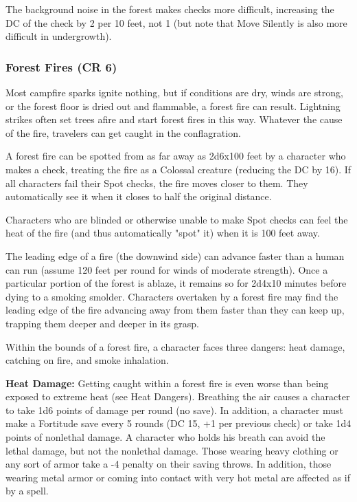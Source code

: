 The background noise in the forest makes  checks more difficult, increasing 
the DC of the check by 2 per 10 feet, not 1 (but note that Move Silently is also 
more difficult in undergrowth). 

\subsubsection{Forest Fires (CR 6)}

Most campfire sparks ignite nothing, but if conditions are dry, winds are strong, 
or the forest floor is dried out and flammable, a forest fire can result. Lightning 
strikes often set trees afire and start forest fires in this way. Whatever the 
cause of the fire, travelers can get caught in the conflagration.

A forest fire can be spotted from as far away as 2d6x100 feet 
by a character who makes a  check, treating the fire as a Colossal creature 
(reducing the DC by 16). If all characters fail their Spot checks, the fire moves 
closer to them. They automatically see it when it closes to half the original distance.

Characters who are blinded or otherwise unable to make Spot checks can feel the 
heat of the fire (and thus automatically "spot" it) when it is 100 feet away.

The leading edge of a fire (the downwind side) can advance faster than a human 
can run (assume 120 feet per round for winds of moderate strength). Once a particular 
portion of the forest is ablaze, it remains so for 2d4x10 minutes 
before dying to a smoking smolder. Characters overtaken by a forest fire may find 
the leading edge of the fire advancing away from them faster than they can keep 
up, trapping them deeper and deeper in its grasp.

Within the bounds of a forest fire, a character faces three dangers: heat damage, 
catching on fire, and smoke inhalation. 

\textbf{Heat Damage:} Getting caught within a forest fire is even worse than being 
exposed to extreme heat (see Heat Dangers). Breathing the air causes a character 
to take 1d6 points of damage per round (no save). In addition, a character must 
make a Fortitude save every 5 rounds (DC 15, +1 per previous check) or take 1d4 
points of nonlethal damage. A character who holds his breath can avoid the lethal 
damage, but not the nonlethal damage. Those wearing heavy clothing or any sort 
of armor take a -4 penalty on their saving throws. In addition, those wearing metal 
armor or coming into contact with very hot metal are affected as if by a  spell.

